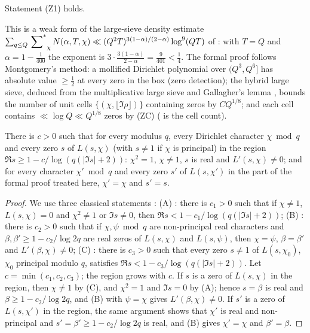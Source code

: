 \begin{littheorem}[Zero density near $\Re s=1$ {\cite[Ch.~12]{Montgomery1971}, \cite{Gallagher1970}}]\label{pf:stageU:zd}
Statement \textup{(Z1)} holds.
\end{littheorem}

This is a weak form of the large-sieve density estimate
$\sum_{q\le Q}\sideset{}{^*}\sum_{\chi}N(\alpha,T,\chi)\ll(Q^2T)^{3(1-\alpha)/(2-\alpha)}\log^9(QT)$ of
\cite[Ch.~12]{Montgomery1971}: with $T=Q$ and $\alpha=1-\frac1{400}$ the exponent is $3\cdot\frac{3(1-\alpha)}{2-\alpha}=\frac9{401}<\frac14$.
The formal proof follows Montgomery's method: a mollified Dirichlet polynomial over $(Q^3,Q^6]$ has absolute value
$\ge\frac12$ at every zero in the box (zero detection); the hybrid large sieve, deduced from the multiplicative large sieve
and Gallagher's lemma \cite{Gallagher1970}, bounds the number of unit cells $\{(\chi,\lfloor\Im\rho\rfloor)\}$ containing zeros by
$CQ^{1/8}$; and each cell contains $\ll\log Q\ll Q^{1/8}$ zeros by (ZC)
( is the cell count).

\begin{lemma}\label{pf:stageU:lp}
There is $c>0$ such that for every modulus $q$, every Dirichlet character $\chi\bmod q$ and every zero $s$ of $L(s,\chi)$
(with $s\ne1$ if $\chi$ is principal) in the region $\Re s\ge1-c/\log(q(|\Im s|+2))$: $\chi^2=1$, $\chi\ne1$, $s$ is real and
$L'(s,\chi)\ne0$; and for every character $\chi'\bmod q$ and every zero $s'$ of $L(s,\chi')$ in the part of the formal proof treated here, $\chi'=\chi$ and
$s'=s$.
\end{lemma}

\begin{proof}
We use three classical statements \cite[Ch.~14]{Davenport2000}:
(A) : there is $c_1>0$ such that if $\chi\ne1$, $L(s,\chi)=0$ and
$\chi^2\ne1$ or $\Im s\ne0$, then $\Re s<1-c_1/\log(q(|\Im s|+2))$;
(B) : there is $c_2>0$ such that if $\chi,\psi\bmod q$ are non-principal real
characters and $\beta,\beta'\ge1-c_2/\log2q$ are real zeros of $L(s,\chi)$ and $L(s,\psi)$, then $\chi=\psi$, $\beta=\beta'$ and
$L'(\beta,\chi)\ne0$;
(C) : there is $c_3>0$ such that every zero $s\ne1$ of $L(s,\chi_0)$, $\chi_0$
principal modulo $q$, satisfies $\Re s<1-c_3/\log(q(|\Im s|+2))$.
Let $c=\min(c_1,c_2,c_3)$; the region grows with $c$. If $s$ is a zero of $L(s,\chi)$ in the region, then $\chi\ne1$ by (C),
and $\chi^2=1$ and $\Im s=0$ by (A); hence $s=\beta$ is real and $\beta\ge1-c_2/\log2q$, and (B) with $\psi=\chi$ gives
$L'(\beta,\chi)\ne0$. If $s'$ is a zero of $L(s,\chi')$ in the region, the same argument shows that $\chi'$ is real and
non-principal and $s'=\beta'\ge1-c_2/\log2q$ is real, and (B) gives $\chi'=\chi$ and $\beta'=\beta$.
\end{proof}


